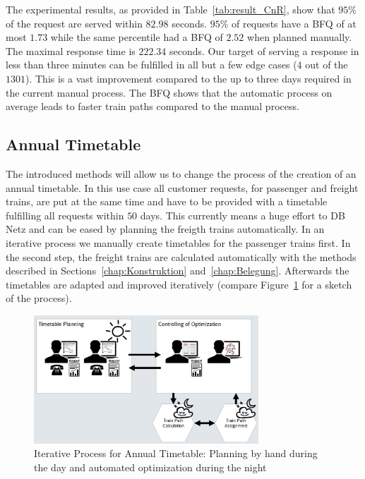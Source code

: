 The experimental results, as provided in Table~\ref{tab:result_CnR}, show that $95\%$ of the request are served within $82.98$ seconds. $95\%$ of requests have a BFQ of at most $1.73$ while the same percentile had a BFQ of $2.52$ when planned manually. The maximal response time is $222.34$ seconds. Our target of serving a response in less than three minutes can be fulfilled in all but a few edge cases ($4$ out of the $1301$). This is a vast improvement compared to the up to three days required in the current manual process. The BFQ shows that the automatic process on average leads to faster train paths compared to the manual process.

\subsection{Annual Timetable}
\label{chap:Netzfahrplan}

The introduced methods will allow us to change the process of the creation of an annual timetable. In this use case all customer requests, for passenger and freight trains, are put at the same time and have to be provided with a timetable fulfilling all requests within $50$ days. This currently means a huge effort to DB Netz and can be eased by planning the freigth trains automatically. In an iterative process we manually create timetables for the passenger trains first. In the second step, the freight trains are calculated automatically with the methods described in Sections~\ref{chap:Konstruktion} and~\ref{chap:Belegung}. Afterwards the timetables are adapted and improved iteratively (compare Figure~\ref{fig:annual_planning} for a sketch of the process).

\begin{figure}[htb]
	\centering
	\includegraphics[width=0.75\textwidth]{Bilder/annual_planning.jpg}
	\caption{Iterative Process for Annual Timetable: Planning by hand during the day and automated optimization during the night}
	\label{fig:annual_planning}
\end{figure}


